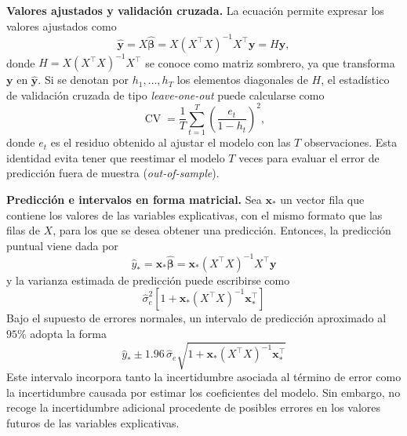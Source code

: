 \documentclass[12pt]{report} %
\begin{document}
\textbf{Valores ajustados y validación cruzada.} La ecuación permite expresar los valores ajustados como
\begin{equation}
    \hat{\mathbf{y}} = X\hat{\boldsymbol{\beta}} = X(X^\top X)^{-1}X^\top \mathbf{y} = H\mathbf{y},
    \label{eq:hat_matrix}
\end{equation}
donde $H = X(X^\top X)^{-1}X^\top$ se conoce como matriz sombrero, ya que transforma $\mathbf{y}$ en $\hat{\mathbf{y}}$. Si se denotan por $h_1, \ldots, h_T$ los elementos diagonales de $H$, el estadístico de validación cruzada de tipo \textit{leave-one-out} puede calcularse como
\begin{equation}
    \operatorname{CV} = \frac{1}{T}\sum_{t=1}^{T}\left(\frac{e_t}{1-h_t}\right)^2,
    \label{eq:cv_hat_matrix}
\end{equation}
donde $e_t$ es el residuo obtenido al ajustar el modelo con las $T$ observaciones. Esta identidad evita tener que reestimar el modelo $T$ veces para evaluar el error de predicción fuera de muestra (\textit{out-of-sample})\cite{Hyndman2021}.

\textbf{Predicción e intervalos en forma matricial.} Sea $\mathbf{x}_*$ un vector fila que contiene los valores de las variables explicativas, con el mismo formato que las filas de $X$, para los que se desea obtener una predicción. Entonces, la predicción puntual viene dada por
\begin{equation}
    \hat{y}_* = \mathbf{x}_*\hat{\boldsymbol{\beta}} = \mathbf{x}_*(X^\top X)^{-1}X^\top \mathbf{y}
    \label{eq:forecast_matrix_form}
\end{equation}
y la varianza estimada de predicción puede escribirse como
\begin{equation}
    \hat{\sigma}_e^2\left[1 + \mathbf{x}_*(X^\top X)^{-1}\mathbf{x}_*^\top\right]
    \label{eq:forecast_variance_matrix}
\end{equation}
Bajo el supuesto de errores normales, un intervalo de predicción aproximado al $95\%$ adopta la forma
\begin{equation}
    \hat{y}_* \pm 1.96\,\hat{\sigma}_e\sqrt{1 + \mathbf{x}_*(X^\top X)^{-1}\mathbf{x}_*^\top}
    \label{eq:forecast_prediction_interval_matrix}
\end{equation}
Este intervalo incorpora tanto la incertidumbre asociada al término de error como la incertidumbre causada por estimar los coeficientes del modelo. Sin embargo, no recoge la incertidumbre adicional procedente de posibles errores en los valores futuros de las variables explicativas.
\end{document}

